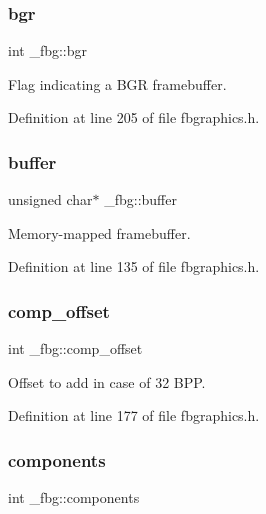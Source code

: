 \mbox{\label{struct__fbg_a5844c5bf4789117cbc0c972ff160b338}} 
\subsubsection{\texorpdfstring{bgr}{bgr}}
{\footnotesize\ttfamily int \+\_\+fbg\+::bgr}



Flag indicating a B\+GR framebuffer. 



Definition at line 205 of file fbgraphics.\+h.

\mbox{\label{struct__fbg_abd19f36337c99f866e03eb88f6c2a9d5}} 
\subsubsection{\texorpdfstring{buffer}{buffer}}
{\footnotesize\ttfamily unsigned char$\ast$ \+\_\+fbg\+::buffer}



Memory-\/mapped framebuffer. 



Definition at line 135 of file fbgraphics.\+h.

\mbox{\label{struct__fbg_a7c2e64d2f40575c8a989c759c30acb0e}} 
\subsubsection{\texorpdfstring{comp\+\_\+offset}{comp\_offset}}
{\footnotesize\ttfamily int \+\_\+fbg\+::comp\+\_\+offset}



Offset to add in case of 32 B\+PP. 



Definition at line 177 of file fbgraphics.\+h.

\mbox{\label{struct__fbg_a1db77a2ef506723a575644dbc1cfb747}} 
\subsubsection{\texorpdfstring{components}{components}}
{\footnotesize\ttfamily int \+\_\+fbg\+::components}



